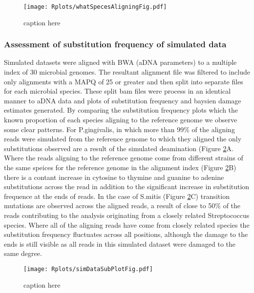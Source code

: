 \documentclass[12pt, a4paper]{article}
\begin{document}
\begin{figure}[ht!]
	\centering
	\texttt{[image: Rplots/whatSpecesAligningFig.pdf]}
	\small\caption{caption here}\label{fig:whatSpeciesAligningFig}
\end{figure}
\clearpage


\subsubsection{Assessment of substitution frequency of simulated data}
Simulated datasets were aligned with BWA (aDNA parameters) to a multiple index of 30 microbial genomes. The resultant alignment file was filtered to include only alignments with a MAPQ of 25 or greater and then split into separate files for each microbial species.  
These split bam files were process in an identical manner to aDNA data and plots of substitution frequency and baysien damage estimates generated. 
By comparing the substitution frequency plots which the known proportion of each species aligning to the reference genome we observe some clear patterns.
For P.gingivalis, in which more than 99\% of the aligning reads were simulated from the reference genome to which they aligned the only substitutions observed are a result of the simulated deamination (Figure \ref{fig:simDataSubPlotFig}A.
Where the reads aligning to the reference genome come from different strains of the same speices for the reference genome in the alignment index (Figure \ref{fig:simDataSubPlotFig}B) there is a contant increase in cytosine to thymine and guanine to adenine substitutions across the read in addition to the significant increase in substitution frequence at the ends of reads.
In the case of S.mitis (Figure \ref{fig:simDataSubPlotFig}C) transition mutations are observed across the aligned reads, a result of close to 50\% of the reads contributing to the analysis originating from a closely related Streptococcus species.
Where all of the aligning reads have come from closely related species the substitution frequency fluctuates across all positions, although the damage to the ends is still visible as all reads in this simulated dataset were damaged to the same degree.


\begin{figure}[ht!]
	\centering
	\texttt{[image: Rplots/simDataSubPlotFig.pdf]}
	\small\caption{caption here}\label{fig:simDataSubPlotFig}
\end{figure}
\end{document}
